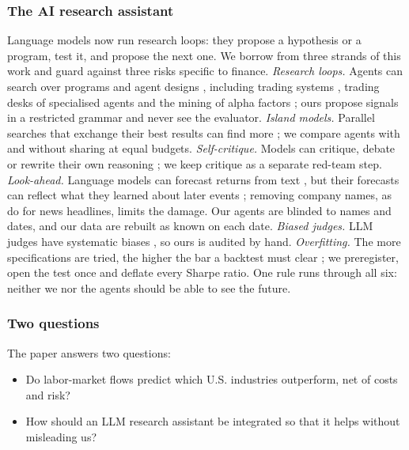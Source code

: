 \documentclass[11pt,letterpaper]{article}
\begin{document}
\subsubsection{The AI research assistant}
Language models now run research loops: they propose a hypothesis or a program,
test it, and propose the next one. We borrow from three strands of this work
and guard against three risks specific to finance.
\emph{Research loops.} Agents can search over programs and agent designs
\citep{hu2025adas,novikov2025,lange2026,zhang2026}, including trading systems
\citep{kvasiuk2026}, trading desks of specialised agents \citep{xiao2024tradingagents}
and the mining of alpha factors \citep{wang2025alphagpt,li2025rdagent}; ours propose
signals in a restricted grammar and never see the evaluator.
\emph{Island models.} Parallel searches that exchange their best results can
find more \citep{tanese1989,romeraparedes2024}; we compare agents with and
without sharing at equal budgets.
\emph{Self-critique.} Models can critique, debate or rewrite their own
reasoning \citep{madaan2023,shinn2023,du2024,spiess2025,yin2025}; we keep
critique as a separate red-team step.
\emph{Look-ahead.} Language models can forecast returns from text
\citep{lopezlira2023,chen2023llm}, but their forecasts can reflect what they
learned about later events \citep{sarkar2024}; removing company names, as
\citet{glasserman2023} do for news headlines, limits the damage. Our agents are
blinded to names and dates, and our data are rebuilt as known on each date.
\emph{Biased judges.} LLM judges have systematic biases \citep{zheng2023}, so
ours is audited by hand.
\emph{Overfitting.} The more specifications are tried, the higher the bar a
backtest must clear \citep{harvey2016,harvey2017,bailey2014}; we preregister,
open the test once and deflate every Sharpe ratio.
One rule runs through all six: neither we nor the agents should be able to see
the future.

\vspace{0.3cm}
\subsubsection{Two questions}
The paper answers two questions:
\begin{itemize}[leftmargin=2.4em, labelsep=0.6em, itemsep=3pt, topsep=4pt]
\item[\textbf{Q1.}] Do labor-market flows predict which U.S. industries
  outperform, net of costs and risk?
\item[\textbf{Q2.}] How should an LLM research assistant be integrated so that
  it helps without misleading us?
\end{itemize}
\end{document}

